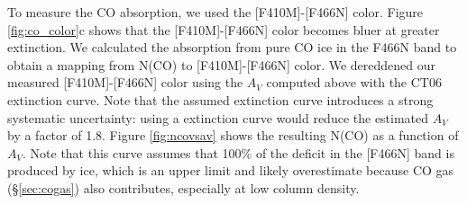 \documentclass[times,astrosymb,twocolumn]{aastex631}
\def\rr#1{#1}
\begin{document}
To measure the CO absorption, we use\rr{d} the [F410M]-[F466N] color.
Figure \ref{fig:co_color}c shows that the [F410M]-[F466N] color \rr{becomes} bluer at \rr{greater} extinction.
We calculate\rr{d} the absorption from pure CO ice in the F466N band to obtain a mapping from N(CO) to [F410M]-[F466N] color.  %
We deredden\rr{ed} our measured [F410M]-[F466N] color using the $A_V$ computed above with the CT06 extinction curve.
\rr{Note that the assumed extinction curve introduces a strong systematic uncertainty: using a \citet{Fritz2011} extinction curve would reduce the estimated $A_V$ by a factor of 1.8.}
Figure \ref{fig:ncovsav} shows the resulting N(CO) as a function of $A_V$.
\rr{Note that this curve assumes that 100\% of the deficit in the [F466N] band is produced by ice, which is an upper limit and likely overestimate because CO gas (\S \ref{sec:cogas}) also contributes, especially at low column density.}

\end{document}
